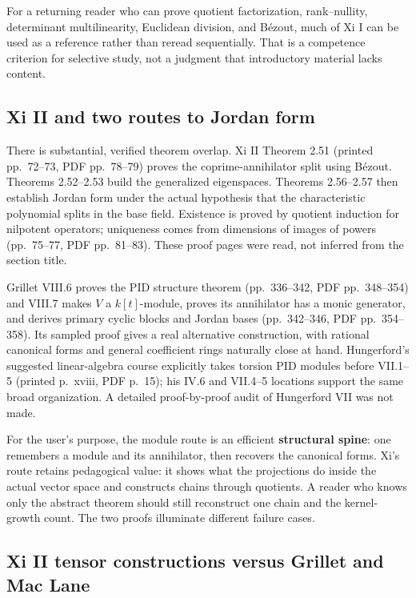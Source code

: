 \documentclass[
  11pt,
]{article}
\begin{document}
For a returning reader who can prove quotient factorization,
rank--nullity, determinant multilinearity, Euclidean division, and
Bézout, much of Xi I can be used as a reference rather than reread
sequentially. That is a competence criterion for selective study, not a
judgment that introductory material lacks content.

\subsection{Xi II and two routes to Jordan
form}\label{xi-ii-and-two-routes-to-jordan-form}

There is substantial, verified theorem overlap. Xi II Theorem 2.51
(printed pp.~72--73, PDF pp.~78--79) proves the coprime-annihilator
split using Bézout. Theorems 2.52--2.53 build the generalized
eigenspaces. Theorems 2.56--2.57 then establish Jordan form under the
actual hypothesis that the characteristic polynomial splits in the base
field. Existence is proved by quotient induction for nilpotent
operators; uniqueness comes from dimensions of images of powers
(pp.~75--77, PDF pp.~81--83). These proof pages were read, not inferred
from the section title.

Grillet VIII.6 proves the PID structure theorem (pp.~336--342, PDF
pp.~348--354) and VIII.7 makes \(V\) a \(k[t]\)-module, proves its
annihilator has a monic generator, and derives primary cyclic blocks and
Jordan bases (pp.~342--346, PDF pp.~354--358). Its sampled proof gives a
real alternative construction, with rational canonical forms and general
coefficient rings naturally close at hand. Hungerford's suggested
linear-algebra course explicitly takes torsion PID modules before
VII.1--5 (printed p.~xviii, PDF p.~15); his IV.6 and VII.4--5 locations
support the same broad organization. A detailed proof-by-proof audit of
Hungerford VII was not made.

For the user's purpose, the module route is an efficient
\textbf{structural spine}: one remembers a module and its annihilator,
then recovers the canonical forms. Xi's route retains pedagogical value:
it shows what the projections do inside the actual vector space and
constructs chains through quotients. A reader who knows only the
abstract theorem should still reconstruct one chain and the
kernel-growth count. The two proofs illuminate different failure cases.

\subsection{Xi II tensor constructions versus Grillet and Mac
Lane}\label{xi-ii-tensor-constructions-versus-grillet-and-mac-lane}
\end{document}
